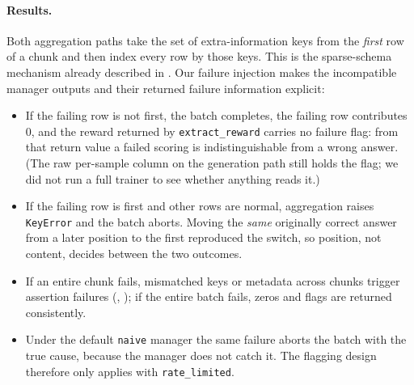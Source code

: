 \documentclass[10pt,a4paper]{article}
\let\cite\citep
\begin{document}
\paragraph{Results.}
Both aggregation paths take the set of extra-information keys from the
\emph{first} row of a chunk and then index every row by those keys.
This is the sparse-schema mechanism already described in
\cite{verl6545,verl7151}. Our failure injection makes the incompatible
manager outputs and their returned failure information explicit:
\begin{itemize}[leftmargin=*]
\item If the failing row is not first, the batch completes, the failing row
      contributes $0$, and the reward returned by \texttt{extract\_reward}
      carries no failure flag: from that return value a failed scoring is
      indistinguishable from a wrong answer. (The raw per-sample column on
      the generation path still holds the flag; we did not run a full trainer
      to see whether anything reads it.)
\item If the failing row is first and other rows are normal, aggregation
      raises \texttt{KeyError} and the batch aborts. Moving the \emph{same}
      originally correct answer from a later position to the first reproduced
      the switch, so position, not content, decides between the two outcomes.
\item If an entire chunk fails, mismatched keys or metadata across chunks
      trigger assertion failures (,
      ); if the entire batch fails, zeros and flags
      are returned consistently.
\item Under the default \texttt{naive} manager the same failure aborts the
      batch with the true cause, because the manager does not catch it. The
      flagging design therefore only applies with \texttt{rate\_limited}.
\end{itemize}
\end{document}
